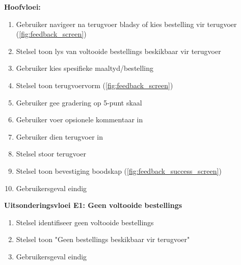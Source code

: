 \textbf{Hoofvloei:}
\begin{enumerate}
    \item Gebruiker navigeer na terugvoer bladsy of kies bestelling vir terugvoer (\autoref{fig:feedback_screen})
    \item Stelsel toon lys van voltooide bestellings beskikbaar vir terugvoer
    \item Gebruiker kies spesifieke maaltyd/bestelling
    \item Stelsel toon terugvoervorm (\autoref{fig:feedback_screen})
    \item Gebruiker gee gradering op 5-punt skaal
    \item Gebruiker voer opsionele kommentaar in
    \item Gebruiker dien terugvoer in
    \item Stelsel stoor terugvoer 
    \item Stelsel toon bevestiging boodskap (\autoref{fig:feedback_success_screen})
    \item Gebruikersgeval eindig
\end{enumerate}

\textbf{Uitsonderingsvloei E1: Geen voltooide bestellings}
\begin{enumerate}
    \item[2a.] Stelsel identifiseer geen voltooide bestellings
    \item Stelsel toon "Geen bestellings beskikbaar vir terugvoer"
    \item Gebruikersgeval eindig
\end{enumerate}

